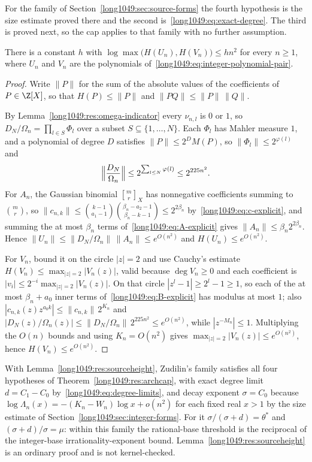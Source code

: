 \documentclass[11pt]{article}
\begin{document}
For the family of Section~\ref{long1049:sec:source-forms} the fourth hypothesis is the
size estimate proved there and the second is~\eqref{long1049:eq:exact-degree}.  The third
is proved next, so the cap applies to that family with no further assumption.

\begin{lemma}\label{long1049:res:sourceheight}
There is a constant $h$ with
$\log\max\bigl(H(U_n),H(V_n)\bigr)\le hn^{2}$ for every $n\ge1$, where $U_n$ and
$V_n$ are the polynomials of~\eqref{long1049:eq:integer-polynomial-pair}.
\end{lemma}

\begin{proof}
Write $\|P\|$ for the sum of the absolute values of the coefficients of
$P\in\Z[X]$, so that $H(P)\le\|P\|$ and $\|PQ\|\le\|P\|\,\|Q\|$.

By Lemma~\ref{long1049:res:omega-indicator} every $\nu_{n,l}$ is $0$ or $1$, so
$D_N/\Omega_n=\prod_{l\in S}\Phi_l$ over a subset $S\subseteq\{1,\dots,N\}$.
Each $\Phi_l$ has Mahler measure $1$, and a polynomial of degree $D$ satisfies
$\|P\|\le2^{D}M(P)$, so $\|\Phi_l\|\le2^{\varphi(l)}$ and
\[
 \Bigl\|\frac{D_N}{\Omega_n}\Bigr\|\le2^{\sum_{l\le N}\varphi(l)}\le2^{225n^{2}} .
\]
For $A_n$, the Gaussian binomial $\genfrac{[}{]}{0pt}{}{m}{r}_X$ has nonnegative
coefficients summing to $\binom{m}{r}$, so
$\|c_{n,k}\|\le\binom{k-1}{a_1-1}\binom{\beta_n-a_2-1}{\beta_n-k-1}\le2^{2\beta_n}$
by~\eqref{long1049:eq:c-explicit}, and summing the at most $\beta_n$ terms
of~\eqref{long1049:eq:A-explicit} gives $\|A_n\|\le\beta_n2^{2\beta_n}$.  Hence
$\|U_n\|\le\|D_N/\Omega_n\|\,\|A_n\|\le e^{O(n^{2})}$ and
$H(U_n)\le e^{O(n^{2})}$.

For $V_n$, bound it on the circle $|z|=2$ and use Cauchy's estimate
$H(V_n)\le\max_{|z|=2}|V_n(z)|$, valid because $\deg V_n\ge0$ and each
coefficient is $|v_i|\le2^{-i}\max_{|z|=2}|V_n(z)|$.  On that circle
$|z^{l}-1|\ge2^{l}-1\ge1$, so each of the at most $\beta_n+a_0$ inner terms
of~\eqref{long1049:eq:B-explicit} has modulus at most $1$; also
$|c_{n,k}(z)z^{a_0k}|\le\|c_{n,k}\|\,2^{K_n}$ and
$|D_N(z)/\Omega_n(z)|\le\|D_N/\Omega_n\|\,2^{225n^{2}}\le e^{O(n^{2})}$, while
$|z^{-M_n}|\le1$.  Multiplying the $O(n)$ bounds and using $K_n=O(n^{2})$ gives
$\max_{|z|=2}|V_n(z)|\le e^{O(n^{2})}$, hence $H(V_n)\le e^{O(n^{2})}$.
\end{proof}

\noindent With Lemma~\ref{long1049:res:sourceheight}, Zudilin's family satisfies all four
hypotheses of Theorem~\ref{long1049:res:archcap}, with exact degree limit $d=C_1-C_0$
by~\eqref{long1049:eq:degree-limits}, and decay exponent $\sigma=C_0$ because
$\log\Lambda_n(x)=-(K_n-W_n)\log x+o(n^{2})$ for each fixed real $x>1$ by the
size estimate of Section~\ref{long1049:sec:integer-forms}.  For it $\sigma/(\sigma+d)=\theta^{*}$ and
$(\sigma+d)/\sigma=\mu$: within this family the rational-base threshold is the
reciprocal of the integer-base irrationality-exponent bound.
Lemma~\ref{long1049:res:sourceheight} is an ordinary proof and is not kernel-checked.
\end{document}
